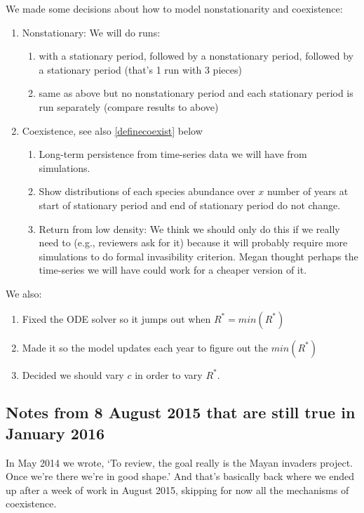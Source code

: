 \documentclass[11pt,a4paper,oneside]{article}
\begin{document}
We made some decisions about how to model nonstationarity and coexistence:
\begin{enumerate}
\item Nonstationary: We will do runs:
\begin{enumerate}
\item with a stationary period, followed by a nonstationary period, followed by a stationary period (that's 1 run with 3 pieces) 
\item same as above but no nonstationary period and each stationary period is run separately (compare results to above)
\end{enumerate}
\item Coexistence, see also \ref{definecoexist} below
\begin{enumerate}
\item Long-term persistence from time-series data we will have from simulations.
\item Show distributions of each species abundance over $x$ number of years at start of stationary period and end of stationary period do not change.
\item Return from low density: We think we should only do this if we really need to (e.g., reviewers ask for it) because it will probably require more simulations to do formal invasibility criterion. Megan thought perhaps the time-series we will have could work for a cheaper version of it.
\end{enumerate}
\end{enumerate}

We also:
\begin{enumerate}
\item Fixed the ODE solver so it jumps out when $R^{*}=min(R^{*})$
\item Made it so the model updates each year to figure out the $min(R^{*})$
\item Decided we should vary $c$ in order to vary $R^{*}$.
\end{enumerate}

\subsection{Notes from 8 August 2015 that are still true in January 2016}

In May 2014 we wrote, `To review, the goal really is the Mayan invaders project. Once we're there we're in good shape.' And that's basically back where we ended up after a week of work in August 2015, skipping for now all the mechanisms of coexistence.\\
\end{document}
